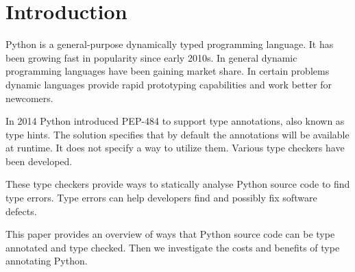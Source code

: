 \chapter{Introduction\label{intro}}


Python is a general-purpose dynamically typed programming language. It has been growing fast in popularity since early 2010s.
In general dynamic programming languages have been gaining market share. In certain problems dynamic languages provide rapid prototyping capabilities and work better for newcomers. %

In 2014 Python introduced PEP-484 to support type annotations, also known as type hints. \cite{pep_484} The solution specifies that by default the annotations will be available at runtime. It does not specify a way to utilize them. Various type checkers have been developed. %

These type checkers provide ways to statically analyse Python source code to find type errors. Type errors can help developers find and possibly fix software defects. \cite{khan_empirical_2022} 

This paper provides an overview of ways that Python source code can be type annotated and type checked. Then we investigate the costs and benefits of type annotating Python.

